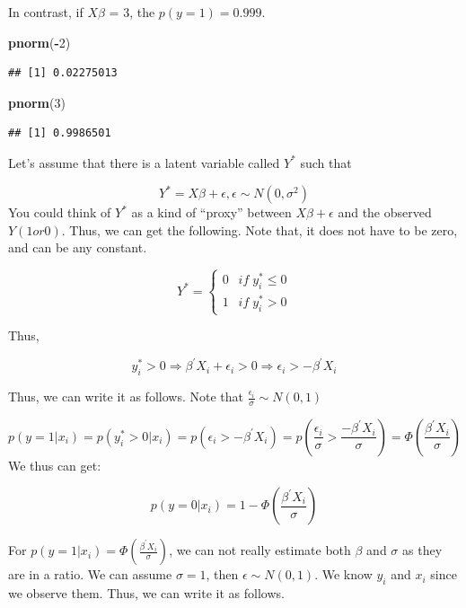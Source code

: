 \documentclass[]{book}
\newenvironment{Shaded}{\begin{snugshade}}{\end{snugshade}}
\newcommand{\KeywordTok}[1]{\textcolor[rgb]{0.13,0.29,0.53}{\textbf{#1}}}
\newcommand{\DecValTok}[1]{\textcolor[rgb]{0.00,0.00,0.81}{#1}}
\newcommand{\OperatorTok}[1]{\textcolor[rgb]{0.81,0.36,0.00}{\textbf{#1}}}
\newcommand{\NormalTok}[1]{#1}
\begin{document}
In contrast, if \(X\beta\) = 3, the \(p(y=1)=0.999\).

\begin{Shaded}
\begin{Highlighting}[]
\KeywordTok{pnorm}\NormalTok{(}\OperatorTok{-}\DecValTok{2}\NormalTok{)}
\end{Highlighting}
\end{Shaded}

\begin{verbatim}
## [1] 0.02275013
\end{verbatim}

\begin{Shaded}
\begin{Highlighting}[]
\KeywordTok{pnorm}\NormalTok{(}\DecValTok{3}\NormalTok{)}
\end{Highlighting}
\end{Shaded}

\begin{verbatim}
## [1] 0.9986501
\end{verbatim}

Let's assume that there is a latent variable called \(Y^*\) such that

\[Y^*=X\beta+\epsilon, \epsilon \sim N(0,\sigma^2)\] You could think of
\(Y^*\) as a kind of ``proxy'' between \(X\beta+\epsilon\) and the
observed \(Y (1 or 0)\). Thus, we can get the following. Note that, it
does not have to be zero, and can be any constant.

\[
Y^*=\begin{cases} 0 \;\;\: if \;  y_i^* \leq 0 \\ 1 \;\;\: if \;  y_i^* > 0 \end{cases}
\]

Thus,

\[y_i^* > 0 \Rightarrow \beta^{'}X_i + \epsilon_i >0 \Rightarrow \epsilon_i > -\beta^{'}X_i\]

Thus, we can write it as follows. Note that
\(\frac{ \epsilon_i}{\sigma} \sim N(0,1)\)

\[p(y=1|x_i)= p(y_i^* >0|x_i)=p(\epsilon_i > -\beta^{'}X_i)= p(\frac{ \epsilon_i}{\sigma}>\frac{-\beta^{'}X_i}{\sigma})=\Phi(\frac{\beta^{'}X_i}{\sigma}) \]
We thus can get:

\[p(y=0|x_i)=1-\Phi(\frac{\beta^{'}X_i}{\sigma})\]

For \(p(y=1|x_i)=\Phi(\frac{\beta^{'}X_i}{\sigma})\), we can not really
estimate both \(\beta\) and \(\sigma\) as they are in a ratio. We can
assume \(\sigma =1\), then \(\epsilon \sim N(0,1)\). We know \(y_i\) and
\(x_i\) since we observe them. Thus, we can write it as follows.
\end{document}
